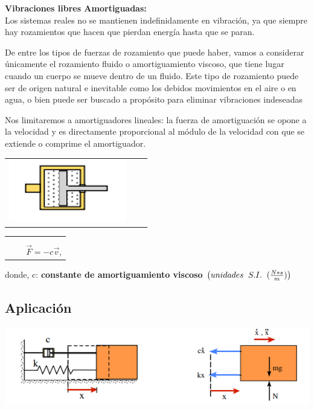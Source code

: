 \documentclass[oneside,12pt]{report}
\begin{document}
	
	
	
\textbf{Vibraciones libres Amortiguadas:}\\
	
	
	Los sistemas reales no se mantienen indefinidamente en vibración, ya que siempre hay rozamientos que hacen que pierdan energía hasta que se paran.
	
	De entre los tipos de fuerzas de rozamiento que puede haber, vamos a considerar únicamente el rozamiento fluido o amortiguamiento viscoso, que tiene lugar cuando un cuerpo se mueve dentro de un fluido.
	Este tipo de rozamiento puede ser de origen natural e inevitable como los debidos movimientos en el aire o en agua, o bien puede ser buscado a propósito para eliminar vibraciones indeseadas
	
	Nos limitaremos a amortiguadores lineales: la fuerza de amortiguación se opone a la velocidad y es directamente proporcional al módulo de la velocidad con que se extiende o comprime el amortiguador.
	
	\begin{center}
		\begin{tabular}{rcc}
	
			\includegraphics[width=0.4\linewidth]{imagen1}
		
	&&
	\end{tabular}	\begin{tabular}{rcc}
		&&\\[0.5cm]
			&&\\
	&&{\LARGE $\vec{F}=-c\vec{v}$},\vspace{2cm}
\end{tabular}
	\end{center}
	donde,	c:\textbf{ constante de amortiguamiento viscoso} $\left( unidades\hspace{0.2cm} S.I.\hspace{0.2cm} (\frac{N*s}{m})\right) $
\subsection{Aplicación}
\begin{center}
	\includegraphics[width=0.7\linewidth]{imagen2}
\end{center}
\end{document}
